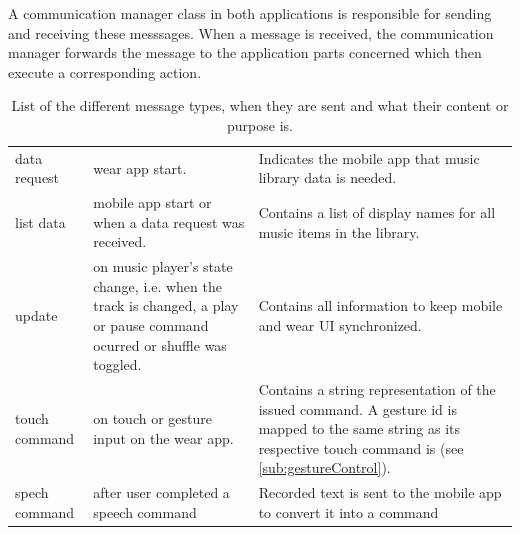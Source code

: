A communication manager class in both applications is responsible for sending and receiving these messsages. When a message is received, the communication manager forwards the message to the application parts concerned which then execute a corresponding action.

\begin{table}[h]
	\myfloatalign
	\begin{tabularx}{\textwidth}{XXX} \toprule
		\tableheadline{Message Type} & \tableheadline{When Sent} & \tableheadline{Purpose} \\ 
		\midrule
		data request & wear app start. & Indicates the mobile app that music library data is needed. \\
		list data & mobile app start or when a data request was received. & Contains a list of display names for all music items in the library. \\
		update & on music player's state change, i.e. when the track is changed, a play or pause command ocurred or shuffle was toggled. & Contains all information to keep mobile and wear \ac{UI} synchronized. \\
		touch command & on touch or gesture input on the wear app. & Contains a string representation of the issued command. A gesture id is mapped to the same string as its respective touch command is (see \ref{sub:gestureControl}). \\
		spech command & after user completed a speech command & Recorded text is sent to the mobile app to convert it into a command \\
		\bottomrule
	\end{tabularx}
	\caption{List of the different message types, when they are sent and what their content or purpose is.}
	\label{tab:messageTypes}
\end{table}

